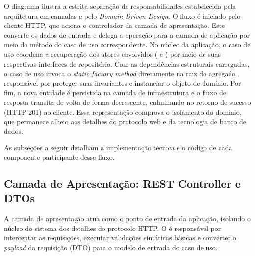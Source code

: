 O diagrama ilustra a estrita separação de responsabilidades estabelecida pela arquitetura em camadas e pelo \textit{Domain-Driven Design}. O fluxo é iniciado pelo cliente HTTP, que aciona o controlador da camada de apresentação. Este converte os dados de entrada e delega a operação para a camada de aplicação por meio do método  do caso de uso correspondente. No núcleo da aplicação, o caso de uso coordena a recuperação dos atores envolvidos ( e ) por meio de suas respectivas interfaces de repositório. Com as dependências estruturais carregadas, o caso de uso invoca o \textit{static factory method}  diretamente na raiz do agregado , responsável por proteger suas invariantes e instanciar o objeto de domínio. Por fim, a nova entidade é persistida na camada de infraestrutura e o fluxo de resposta transita de volta de forma decrescente, culminando no retorno de sucesso (HTTP 201) ao cliente. Essa representação comprova o isolamento do domínio, que permanece alheio aos detalhes do protocolo web e da tecnologia de banco de dados.

As subseções a seguir detalham a implementação técnica e o código de cada componente participante desse fluxo.

\subsection{Camada de Apresentação: REST Controller e DTOs}

A camada de apresentação atua como o ponto de entrada da aplicação, isolando o núcleo do sistema dos detalhes do protocolo HTTP. O  é responsável por interceptar as requisições, executar validações sintáticas básicas e converter o \textit{payload} da requisição (DTO) para o modelo de entrada do caso de uso.

